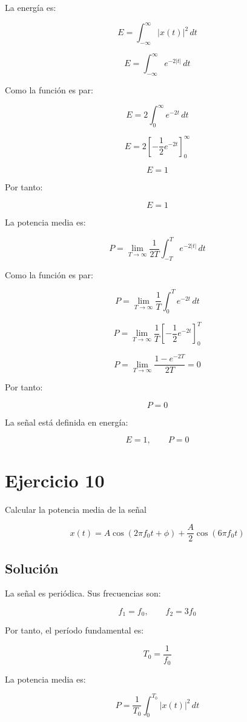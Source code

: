 \documentclass[fleqn]{article}
\begin{document}
	La energía es:

	\[
	E
	=
	\int_{-\infty}^{\infty}
	|x(t)|^2\,dt
	\]

	\[
	E
	=
	\int_{-\infty}^{\infty}
	e^{-2|t|}\,dt
	\]

	Como la función es par:

	\[
	E
	=
	2\int_0^{\infty}
	e^{-2t}\,dt
	\]

	\[
	E
	=
	2
	\left[
	-\frac{1}{2}e^{-2t}
	\right]_0^{\infty}
	\]

	\[
	E=1
	\]

	Por tanto:

	\[
	\boxed{
	E=1
	}
	\]

	La potencia media es:

	\[
	P
	=
	\lim_{T\to\infty}
	\frac{1}{2T}
	\int_{-T}^{T}
	e^{-2|t|}\,dt
	\]

	Como la función es par:

	\[
	P
	=
	\lim_{T\to\infty}
	\frac{1}{T}
	\int_0^T
	e^{-2t}\,dt
	\]

	\[
	P
	=
	\lim_{T\to\infty}
	\frac{1}{T}
	\left[
	-\frac{1}{2}e^{-2t}
	\right]_0^T
	\]

	\[
	P
	=
	\lim_{T\to\infty}
	\frac{1-e^{-2T}}{2T}
	=
	0
	\]

	Por tanto:

	\[
	\boxed{
	P=0
	}
	\]

	La señal está definida en energía:

	\[
	\boxed{
	E=1,
	\qquad
	P=0
	}
	\]

\section{Ejercicio 10}
	Calcular la potencia media de la señal

	\[
	x(t)=A\cos(2\pi f_0t+\phi)
	+\frac{A}{2}\cos(6\pi f_0t)
	\]

	\subsection{Solución}

	La señal es periódica. Sus frecuencias son:

	\[
	f_1=f_0,
	\qquad
	f_2=3f_0
	\]

	Por tanto, el período fundamental es:

	\[
	T_0=\frac{1}{f_0}
	\]

	La potencia media es:

	\[
	P
	=
	\frac{1}{T_0}
	\int_0^{T_0}
	|x(t)|^2\,dt
	\]
\end{document}

